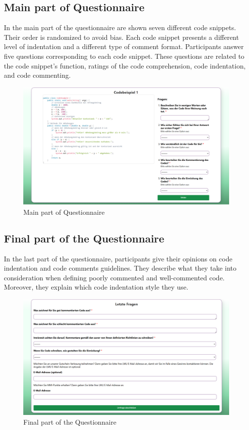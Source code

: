 \subsection{Main part of Questionnaire}

In the main part of the questionnaire are shown seven different code snippets. Their order is randomized to avoid bias. Each code snippet presents a different level of indentation and a different type of comment format.
Participants answer five questions corresponding to each code snippet. These questions are related to the code snippet’s function, ratings of the code comprehension, code indentation, and code commenting.


\begin{figure} [H]
  \centering
  \includegraphics[scale=0.45]{figures/main_p.png}
  \caption{Main part of Questionnaire}
  \label{fig:AnhangsChor}
\end{figure}



\subsection{Final part of the Questionnaire}
In the last part of the questionnaire, participants give their opinions on code indentation and code comments guidelines. They describe what they take into consideration when defining poorly commented and well-commented code. Moreover, they explain which code indentation style they use.  


\begin{figure}  [H]
  \centering
  \includegraphics[scale=0.45]{figures/last_part.png}
  \caption{Final part of the Questionnaire}
  \label{fig:AnhangsChor}
\end{figure}


